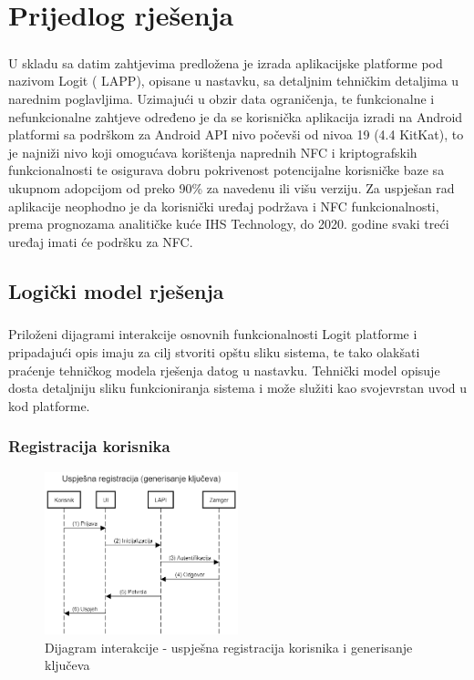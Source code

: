 \chapter{Prijedlog rješenja}
\paragraph*{}
U skladu sa datim zahtjevima predložena je izrada aplikacijske platforme pod nazivom Logit (
\gls{LAPP}), opisane u nastavku, sa detaljnim tehničkim detaljima u narednim poglavljima. Uzimajući u obzir data ograničenja, te funkcionalne i nefunkcionalne zahtjeve određeno je da se korisnička aplikacija izradi na Android platformi sa podrškom za Android API nivo počevši od nivoa 19 (4.4 KitKat), to je najniži nivo koji omogućava korištenja naprednih NFC i kriptografskih funkcionalnosti te osigurava dobru pokrivenost potencijalne korisničke baze sa ukupnom adopcijom od preko 90\% za navedenu ili višu verziju\cite{droidstats}. Za uspješan rad aplikacije neophodno je da korisnički uređaj podržava i NFC funkcionalnosti, prema prognozama analitičke kuće IHS Technology, do 2020. godine svaki treći uređaj imati će podršku za NFC.\cite{nfcforecast}

\section{Logički model rješenja}
\paragraph*{}
Priloženi dijagrami interakcije osnovnih funkcionalnosti Logit platforme i pripadajući opis imaju za cilj stvoriti opštu sliku sistema, te tako olakšati praćenje tehničkog modela rješenja datog u nastavku. Tehnički model opisuje dosta detaljniju sliku funkcioniranja sistema i može služiti kao svojevrstan uvod u kod platforme.

\subsection*{Registracija korisnika}
\begin{figure}[H]
    \centering
    \includegraphics[width=0.5\textwidth]{material/dia/01_registracija}
    \caption{Dijagram interakcije - uspješna registracija korisnika i generisanje ključeva}
\end{figure}


